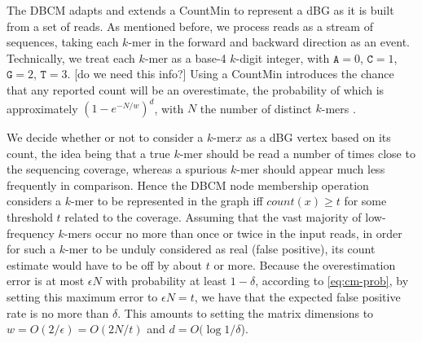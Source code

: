 \documentclass[a4paper,12pt]{article}
\newcommand{\dBG}{de~Bruijn graph\xspace}
\newcommand{\cm}{CountMin\xspace}
\newcommand{\kmer}{\mbox{$k$-mer}\xspace}
\newcommand{\kmers}{\mbox{$k$-mers}\xspace}
\newcommand{\chr}[1]{\ensuremath{\mathtt{#1}}}
\newcommand{\A}{\chr{A}}
\newcommand{\C}{\chr{C}}
\newcommand{\G}{\chr{G}}
\newcommand{\T}{\chr{T}}
\newcommand{\todo}[2][]{\color{red} [#1] #2 \color{black}}
\begin{document}
The DBCM adapts and extends a \cm to represent a dBG as it is built from a set of reads. As mentioned before, we process reads as a stream of sequences, taking each \kmer in the forward and backward direction as an event. Technically, we treat each \kmer as a base-4 $k$-digit integer, with $\A=0$, $\C=1$, $\G=2$, $\T=3$. 
\todo[do we need this info?]{Using a \cm introduces the chance that any reported count will be an overestimate, the probability of which is approximately $(1-e^{-N/w})^d$, with $N$ the number of distinct \kmer{s} \cite{Zhang2014}}.

We decide whether or not to consider a \kmer $x$ as a dBG vertex based on its count, the idea being that a true \kmer should be read a number of times close to the sequencing coverage, whereas a spurious \kmer should appear much less frequently in comparison. 
Hence the DBCM node membership operation considers a \kmer to be represented in the graph iff $count(x) \geq t$ for some threshold $t$ related to the coverage. 
Assuming that the vast majority of low-frequency \kmers occur no more than once or twice in the input reads, in order for such a \kmer to be unduly considered as real (false positive), its count estimate would have to be off by about $t$ or more. Because the overestimation error is at most $\epsilon N$ with probability at least $1-\delta$, according to \eqref{eq:cm-prob}, by setting this maximum error to $\epsilon N=t$, we have that the expected false positive rate is no more than $\delta$. This amounts to setting the matrix dimensions to $w=O(2/\epsilon) = O(2N/t)$ and $d=O(\log 1/\delta$).


\end{document}

